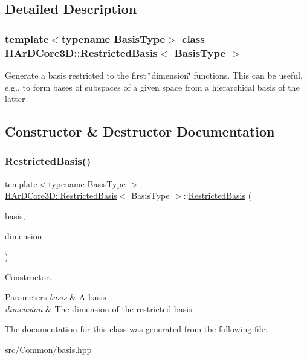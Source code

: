 \subsection{Detailed Description}
\subsubsection*{template$<$typename Basis\+Type$>$\newline
class H\+Ar\+D\+Core3\+D\+::\+Restricted\+Basis$<$ Basis\+Type $>$}

Generate a basis restricted to the first \char`\"{}dimension\char`\"{} functions. This can be useful, e.\+g., to form bases of subspaces of a given space from a hierarchical basis of the latter 

\subsection{Constructor \& Destructor Documentation}
\mbox{\label{classHArDCore3D_1_1RestrictedBasis_ac9623c0deb32ee33cb10de45f4f75702}} 
\subsubsection{\texorpdfstring{Restricted\+Basis()}{RestrictedBasis()}}
{\footnotesize\ttfamily template$<$typename Basis\+Type $>$ \\
\hyperlink{classHArDCore3D_1_1RestrictedBasis}{H\+Ar\+D\+Core3\+D\+::\+Restricted\+Basis}$<$ Basis\+Type $>$\+::\hyperlink{classHArDCore3D_1_1RestrictedBasis}{Restricted\+Basis} (\begin{DoxyParamCaption}\item[{const Basis\+Type \&}]{basis,  }\item[{const size\+\_\+t \&}]{dimension }\end{DoxyParamCaption})\hspace{0.3cm}{\ttfamily [inline]}}



Constructor. 


\begin{DoxyParams}{Parameters}
{\em basis} & A basis \\
\hline
{\em dimension} & The dimension of the restricted basis \\
\hline
\end{DoxyParams}


The documentation for this class was generated from the following file\+:\begin{DoxyCompactItemize}
\item 
src/\+Common/basis.\+hpp\end{DoxyCompactItemize}
